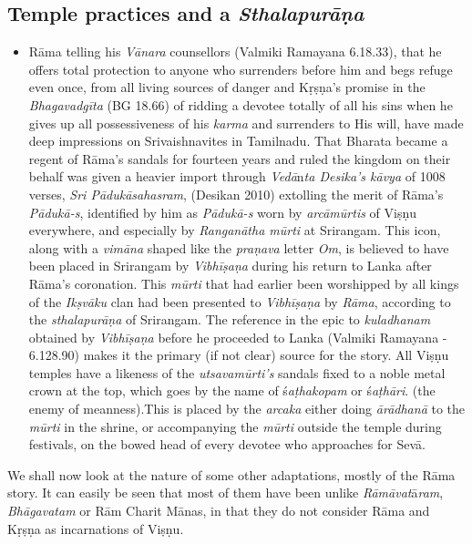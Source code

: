 \subsection*{Temple practices and a \textit{Sthalapurāṇa}}

\begin{itemize}
\item Rāma telling his \textit{Vānara} counsellors (Valmiki Ramayana 6.18.33), that he offers total protection to anyone who surrenders before him and begs refuge even once, from all living sources of danger and Kṛṣṇa’s promise in the \textit{Bhagavadgīta} (BG 18.66) of ridding a devotee totally of all his sins when he gives up all possessiveness of his \textit{karma} and surrenders to His will, have made deep impressions on Srivaishnavites in Tamilnadu. That Bharata became a regent of Rāma’s sandals for fourteen years and ruled the kingdom on their behalf was given a heavier import through \textit{Vedā}n\textit{ta Desika’s kāvya} of 1008 verses, \textit{Sri Pādukāsahasram}, (Desikan 2010) extolling the merit of Rāma’s \textit{Pādukā-s}, identified by him as \textit{Pādukā-s} worn by \textit{arcāmūrtis} of Viṣṇu everywhere, and especially by \textit{Ranganātha mūrti} at Srirangam. This icon, along with a \textit{vimāna} shaped like the \textit{praṇava} letter \textit{Om}, is believed to have been placed in Srirangam by \textit{Vibhīṣaṇa} during his return to Lanka after Rāma’s coronation. This \textit{mūrti} that had earlier been worshipped by all kings of the \textit{Ikṣvāku} clan had been presented to \textit{Vibhīṣaṇa} by \textit{Rāma}, according to the \textit{sthalapurāṇa} of Srirangam. The reference in the epic to \textit{kuladhanam} obtained by \textit{Vibhīṣaṇa} before he proceeded to Lanka (Valmiki Ramayana - 6.128.90) makes it the primary (if not clear) source for the story. All Viṣṇu temples have a likeness of the \textit{utsavamūrti’s} sandals fixed to a noble metal crown at the top, which goes by the name of ś\textit{aṭhakopam} or ś\textit{aṭhāri}. (the enemy of meanness).This is placed by the \textit{arcaka} either doing \textit{ārādhanā} to the \textit{mūrti} in the shrine, or accompanying the \textit{mūrti} outside the temple during festivals, on the bowed head of every devotee who approaches for Sevā.

\end{itemize}

We shall now look at the nature of some other adaptations, mostly of the Rāma story. It can easily be seen that most of them have been unlike \textit{Rāmāvat}ā\textit{ram}, \textit{Bhāgavatam} or Rām Charit Mānas, in that they do not consider Rāma and Kṛṣṇa as incarnations of Viṣṇu.


